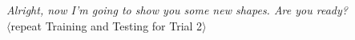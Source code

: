\documentclass[man]{apa2}
\begin{document}
{\it Alright, now I'm going to show you some new shapes. Are you ready?}\\

\vspace{2.5mm}
\noindent $\langle$repeat Training and Testing for Trial 2$\rangle$ \\


\nocite{sanchez2003effect}




\newpage
\theappendix 
\end{document}
